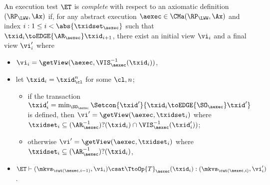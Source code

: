 \begin{definition}
\label{def:et_complete}
An execution test $\ET$ is \emph{complete} with respect 
to an axiomatic definition $(\RP_{\LWW}, \Ax)$ if, for any abstract execution $\aexec \in \CMa(\RP_{\LWW}, \Ax)$ 
and index \( i : 1 \leq i < \abs{\txidset_{\aexec}}\) such that \( \txid_{i} \toEDGE{\AR_{\aexec}} \txid_{i+1} \), there exist an initial view $\vi_{i}$ and a final view $\vi_{i}'$ where 
\begin{itemize}
\item $\vi_{i} = \getView(\aexec, \VIS_{\aexec}^{-1}(\txid_{i}))$, 
\item let $\txid_{i} = \txid_{\cl}^{n}$ for some $\cl, n$; 
    \begin{itemize}
        \item if the transaction $\txid_{i}' = \min_{\SO_{\aexec}}\Setcon{\txid' }{ \txid_i \toEDGE{\SO_{\aexec}} \txid'}$ is defined, then $\vi' = \getView(\aexec, \txidset_{i})$ where $\txidset_{i} \subseteq (\AR_{\aexec}^{-1})?(\txid_{i}) \cap \VIS_{\aexec}^{-1}(\txid_{i}'))$; 
        \item otherwise $\vi' = \getView(\aexec, \txidset_{i})$ where $\txidset_{i} \subseteq (\AR_{\aexec}^{-1})?(\txid_{i})$, 
    \end{itemize}
\item $\ET \vdash (\mkvs_{\cut(\aexec, i-1)}, \vi_{i}) \csat \TtoOp{T}_{\aexec}(\txid_{i}) : (\mkvs_{\cut(\aexec, i)},\vi_{i}')$.
\end{itemize}
\end{definition}

